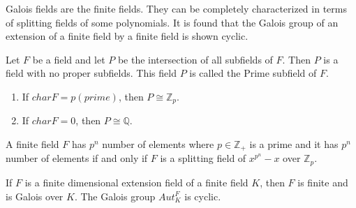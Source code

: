 Galois fields are the finite fields. They can be completely characterized in terms of splitting fields of some polynomials. It is found that the Galois group of an extension of a finite field by a finite field is shown cyclic.\\

\begin{definition}
Let \(F\) be a field and let \(P\) be the intersection of all subfields of \(F\). Then \(P\) is a field with no proper subfields. This field \(P\) is called the Prime subfield of \(F\).
\end{definition}

\begin{enumerate}
\item If \(charF=p(prime)\), then \(P\cong {\mathbb{Z}}_p\).
\item If \(charF=0\), then \(P\cong \mathbb{Q}\).
\end{enumerate}

\begin{theorem}
A  finite field \(F\) has \(p^n\) number of elements where \(p \in \mathbb{Z}_+\) is a prime and it has \(p^n\) number of elements if and only if \(F\) is a splitting field of \(x^{p^n} - x\) over \(\mathbb{Z}_p\).\\
\end{theorem}

\begin{theorem}
  If \(F\) is a finite dimensional extension field of a finite field \(K\), then \(F\) is finite and is Galois over \(K\). The Galois group \(Aut_K^F\) is cyclic.
\end{theorem}
